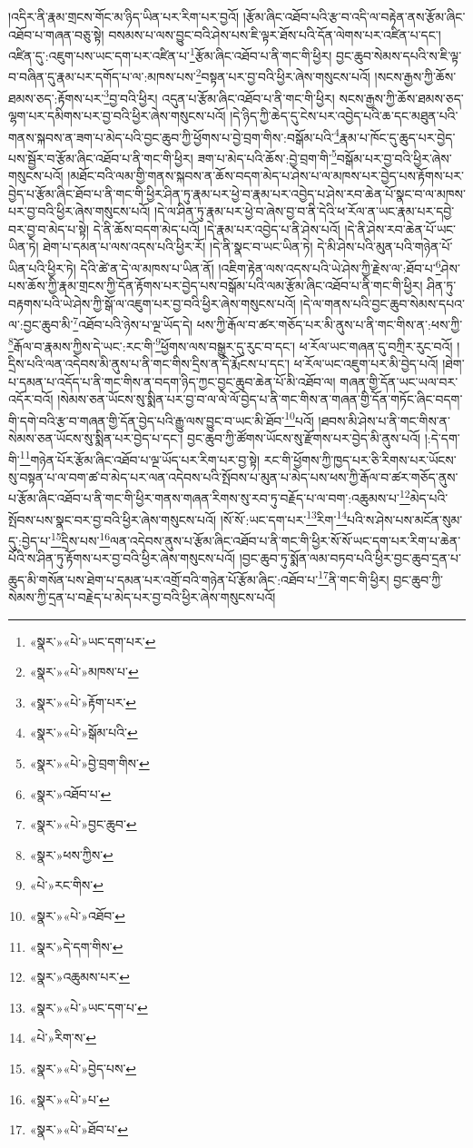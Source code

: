 །འདིར་ནི་རྣམ་གྲངས་གོང་མ་ཉིད་ཡིན་པར་རིག་པར་བྱའོ། །རྩོམ་ཞིང་འཐོབ་པའི་རྩ་བ་འདི་ལ་བརྟེན་ནས་རྩོམ་ཞིང་འཐོབ་པ་གཞན་བཅུ་སྟེ། བསམས་པ་ལས་བྱུང་བའི་ཤེས་པས་ཇི་ལྟར་ཐོས་པའི་དོན་ལེགས་པར་འཛིན་པ་དང་། འཛིན་དུ་:འཇུག་པས་ཡང་དག་པར་འཛིན་པ་\footnote{«སྣར་»«པེ་»ཡང་དག་པར་}རྩོམ་ཞིང་འཐོབ་པ་ནི་གང་གི་ཕྱིར། བྱང་ཆུབ་སེམས་དཔའི་ས་ཇི་ལྟ་བ་བཞིན་དུ་རྣམ་པར་དགོད་པ་ལ་:མཁས་པས་\footnote{«སྣར་»«པེ་»མཁས་པ་}བསྟན་པར་བྱ་བའི་ཕྱིར་ཞེས་གསུངས་པའོ། །སངས་རྒྱས་ཀྱི་ཆོས་ཐམས་ཅད་:རྟོགས་པར་\footnote{«སྣར་»«པེ་»རྟོག་པར་}བྱ་བའི་ཕྱིར། འདུན་པ་རྩོམ་ཞིང་འཐོབ་པ་ནི་གང་གི་ཕྱིར། སངས་རྒྱས་ཀྱི་ཆོས་ཐམས་ཅད་ལྷག་པར་དམིགས་པར་བྱ་བའི་ཕྱིར་ཞེས་གསུངས་པའོ། །དེ་ཉིད་ཀྱི་ཆེད་དུ་ངེས་པར་འབྱེད་པའི་ཆ་དང་མཐུན་པའི་གནས་སྐབས་ན་ཟག་པ་མེད་པའི་བྱང་ཆུབ་ཀྱི་ཕྱོགས་པ་བྱེ་བྲག་གིས་:བསྒོམ་པའི་\footnote{«སྣར་»«པེ་»སྒོམ་པའི་}རྣམ་པ་ཁོང་དུ་ཆུད་པར་བྱེད་པས་སྦྱོར་བ་རྩོམ་ཞིང་འཐོབ་པ་ནི་གང་གི་ཕྱིར། ཟག་པ་མེད་པའི་ཆོས་:བྱེ་བྲག་གི་\footnote{«སྣར་»«པེ་»བྱེ་བྲག་གིས་}བསྒོམ་པར་བྱ་བའི་ཕྱིར་ཞེས་གསུངས་པའོ། །མཐོང་བའི་ལམ་གྱི་གནས་སྐབས་ན་ཆོས་བདག་མེད་པ་ཤེས་པ་ལ་མཁས་པར་བྱེད་པས་རྟོགས་པར་བྱེད་པ་རྩོམ་ཞིང་ཐོབ་པ་ནི་གང་གི་ཕྱིར་ཤིན་ཏུ་རྣམ་པར་ཕྱེ་བ་རྣམ་པར་འབྱེད་པ་ཤེས་རབ་ཆེན་པོ་སྣང་བ་ལ་མཁས་པར་བྱ་བའི་ཕྱིར་ཞེས་གསུངས་པའོ། །དེ་ལ་ཤིན་ཏུ་རྣམ་པར་ཕྱེ་བ་ཞེས་བྱ་བ་ནི་དེའི་ཕ་རོལ་ན་ཡང་རྣམ་པར་དབྱེ་བར་བྱ་བ་མེད་པ་སྟེ། དེ་ནི་ཆོས་བདག་མེད་པའོ། །དེ་རྣམ་པར་འབྱེད་པ་ནི་ཤེས་པའོ། །དེ་ནི་ཤེས་རབ་ཆེན་པོ་ཡང་ཡིན་ཏེ། ཐེག་པ་དམན་པ་ལས་འདས་པའི་ཕྱིར་རོ། །དེ་ནི་སྣང་བ་ཡང་ཡིན་ཏེ། དེ་མི་ཤེས་པའི་མུན་པའི་གཉེན་པོ་ཡིན་པའི་ཕྱིར་ཏེ། དེའི་ཚེ་ན་དེ་ལ་མཁས་པ་ཡིན་ནོ། །འཇིག་རྟེན་ལས་འདས་པའི་ཡེ་ཤེས་ཀྱི་རྗེས་ལ་:ཐོབ་པ་\footnote{«སྣར་»འཐོབ་པ་}ཤེས་པས་ཆོས་ཀྱི་རྣམ་གྲངས་ཀྱི་དོན་རྟོགས་པར་བྱེད་པས་བསྒོམ་པའི་ལམ་རྩོམ་ཞིང་འཐོབ་པ་ནི་གང་གི་ཕྱིར། ཤིན་ཏུ་བརྟགས་པའི་ཡེ་ཤེས་ཀྱི་སྒོ་ལ་འཇུག་པར་བྱ་བའི་ཕྱིར་ཞེས་གསུངས་པའོ། །དེ་ལ་གནས་པའི་བྱང་ཆུབ་སེམས་དཔའ་ལ་:བྱང་ཆུབ་མི་\footnote{«སྣར་»«པེ་»བྱང་ཆུབ་}འཐོབ་པའི་ཉེས་པ་ལྔ་ཡོད་དེ། ཕས་ཀྱི་རྒོལ་བ་ཚར་གཅོད་པར་མི་ནུས་པ་ནི་གང་གིས་ན་:ཕས་ཀྱི་\footnote{«སྣར་»ཕས་ཀྱིས་}རྒོལ་བ་རྣམས་ཀྱིས་དེ་ཡང་:རང་གི་\footnote{«པེ་»རང་གིས་}ཕྱོགས་ལས་བསྒྱུར་དུ་རུང་བ་དང་། ཕ་རོལ་ཡང་གཞན་དུ་བཀྲིར་རུང་བའོ། །དྲིས་པའི་ལན་འདེབས་མི་ནུས་པ་ནི་གང་གིས་དྲིས་ན་དེ་རྨོངས་པ་དང་། ཕ་རོལ་ཡང་འཇུག་པར་མི་བྱེད་པའོ། །ཐེག་པ་དམན་པ་འདོད་པ་ནི་གང་གིས་ན་བདག་ཉིད་ཀྱང་བྱང་ཆུབ་ཆེན་པོ་མི་འཐོབ་ལ། གཞན་གྱི་དོན་ཡང་ཡལ་བར་འདོར་བའོ། །སེམས་ཅན་ཡོངས་སུ་སྨིན་པར་བྱ་བ་ལ་ལེ་ལོ་བྱེད་པ་ནི་གང་གིས་ན་གཞན་གྱི་དོན་གཏོང་ཞིང་བདག་གི་དགེ་བའི་རྩ་བ་གཞན་གྱི་དོན་བྱེད་པའི་རྒྱུ་ལས་བྱུང་བ་ཡང་མི་ཐོབ་\footnote{«སྣར་»«པེ་»འཐོབ་}པའོ། །ཐབས་མི་ཤེས་པ་ནི་གང་གིས་ན་སེམས་ཅན་ཡོངས་སུ་སྨིན་པར་བྱེད་པ་དང་། བྱང་ཆུབ་ཀྱི་ཚོགས་ཡོངས་སུ་རྫོགས་པར་བྱེད་མི་ནུས་པའོ། །:དེ་དག་གི་\footnote{«སྣར་»དེ་དག་གིས་}གཉེན་པོར་རྩོམ་ཞིང་འཐོབ་པ་ལྔ་ཡོད་པར་རིག་པར་བྱ་སྟེ། རང་གི་ཕྱོགས་ཀྱི་ཁྱད་པར་ཅི་རིགས་པར་ཡོངས་སུ་བསྟན་པ་ལ་བག་ཚ་བ་མེད་པར་ལན་འདེབས་པའི་སྤོབས་པ་མུན་པ་མེད་པས་ཕས་ཀྱི་རྒོལ་བ་ཚར་གཅོད་ནུས་པ་རྩོམ་ཞིང་འཐོབ་པ་ནི་གང་གི་ཕྱིར་གནས་གཞན་རིགས་སུ་རབ་ཏུ་བརྗོད་པ་ལ་བག་:འཆུམས་པ་\footnote{«སྣར་»འཆུམས་པར་}མེད་པའི་སྤོབས་པས་སྣང་བར་བྱ་བའི་ཕྱིར་ཞེས་གསུངས་པའོ། །སོ་སོ་:ཡང་དག་པར་\footnote{«སྣར་»«པེ་»ཡང་དག་པ་}རིག་\footnote{«པེ་»རིག་ས་}པའི་ས་ཤེས་པས་མངོན་སུམ་དུ་:བྱེད་པ་\footnote{«སྣར་»«པེ་»བྱེད་པས་}དྲིས་པས་\footnote{«སྣར་»«པེ་»པ་}ལན་འདེབས་ནུས་པ་རྩོམ་ཞིང་འཐོབ་པ་ནི་གང་གི་ཕྱིར་སོ་སོ་ཡང་དག་པར་རིག་པ་ཆེན་པོའི་ས་ཤིན་ཏུ་རྟོགས་པར་བྱ་བའི་ཕྱིར་ཞེས་གསུངས་པའོ། །བྱང་ཆུབ་ཏུ་སྨོན་ལམ་བཏབ་པའི་ཕྱིར་བྱང་ཆུབ་དྲན་པ་ཆུད་མི་གསོན་པས་ཐེག་པ་དམན་པར་འགྲོ་བའི་གཉེན་པོ་རྩོམ་ཞིང་:འཐོབ་པ་\footnote{«སྣར་»«པེ་»ཐོབ་པ་}ནི་གང་གི་ཕྱིར། བྱང་ཆུབ་ཀྱི་སེམས་ཀྱི་དྲན་པ་བརྗེད་པ་མེད་པར་བྱ་བའི་ཕྱིར་ཞེས་གསུངས་པའོ། 
